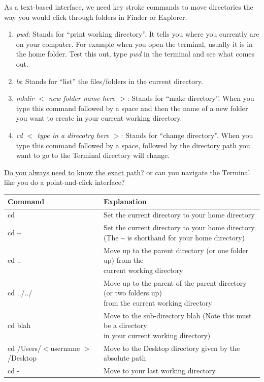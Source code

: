 \documentclass[12pt]{article}
\begin{document}
As a text-based interface, we need key stroke commands to move directories the way you would click through folders in Finder or Explorer.

\begin{enumerate}
\item \textit{pwd}: Stands for ``print working directory''. It tells you where you currently are on your computer. For example when you open the terminal, usually it is in the home folder. Test this out, type \textit{pwd} in the terminal and see what comes out. 
\item \textit{ls}: Stands for ``list'' the files/folders in the current directory. 
\item \textit{mkdir $<$ new folder name here $>$}: Stands for ``make directory''. When you type this command followed by a space and then the name of a new folder you want to create in your current working directory. 
  \item \textit{cd $<$ type in a direcotry here $>$}: Stands for ``change directory''. When you type this command followed by a space, followed by the directory path you want to go to the Terminal directory will change. 
\end{enumerate}

\underline{Do you always need to know the exact path?}
or can you navigate the Terminal like you do a point-and-click interface?

\begin{center}
  \begin{tabular}{| l | l | }
    \hline
    \textbf{Command} & \textbf{Explanation} \\ \hline
    cd        & Set the current directory to your home directory  \\ \hline
    cd \textasciitilde{}     & \shortstack[l]{Set the current directory to your home directory. \\ (The \textasciitilde{} is shorthand for your home directory)} \\  \hline
    cd ..     & \shortstack[l]{Move up to the parent directory (or one folder up) from the \\ current working directory} \\ \hline
    cd ../../ & \shortstack[l]{Move up to the parent of the parent directory (or two folders up)\\ from the current working directory} \\ \hline
    cd blah   & \shortstack[l]{Move to the sub-directory blah (Note this must be a directory\\ in your current working directory)} \\ \hline
    cd /Users/$<$username $>$/Desktop & Move to the Desktop directory given by the absolute path \\ \hline
    cd - & Move to your last working directory \\ \hline
\end{tabular}
\end{center}
\end{document}
